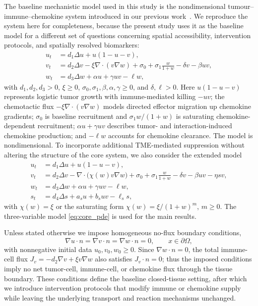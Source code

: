 \documentclass[]{interact}
\theoremstyle{plain}%
\theoremstyle{definition}
\theoremstyle{remark}
\newcommand{\Om}{\Omega}
\begin{document}
The baseline mechanistic model used in this study is the
nondimensional tumour--immune--chemokine system introduced in our
previous work~\cite{liu2026computational}. We reproduce the system
here for completeness, because the present study uses it as the
baseline model for a different set of questions concerning spatial
accessibility, intervention protocols, and spatially resolved
biomarkers:
\begin{equation}
\label{eq:core_pde}
\begin{aligned}
u_t &= d_1\Delta u+u(1-u-v),\\
v_t &= d_2\Delta v-\xi\nabla\cdot(v\nabla w)
+\sigma_0+\sigma_1\frac{w}{1+w}-\delta v-\beta uv,\\
w_t &= d_3\Delta w+\alpha u+\gamma uv-\ell w,
\end{aligned}
\end{equation}
with $d_1,d_2,d_3>0$, $\xi\ge0$, $\sigma_0,\sigma_1,\beta,\alpha,\gamma\ge0$,
and $\delta,\ell>0$. Here $u(1-u-v)$ represents logistic tumor growth
with immune-mediated killing $-uv$; the chemotactic flux
$-\xi\nabla\cdot(v\nabla w)$ models directed effector migration up chemokine
gradients; $\sigma_0$ is baseline recruitment and
$\sigma_1 w/(1+w)$ is saturating chemokine-dependent recruitment;
$\alpha u+\gamma uv$ describes tumor- and interaction-induced chemokine
production; and $-\ell w$ accounts for chemokine clearance. The model is
nondimensional. To incorporate additional TME-mediated suppression without
altering the structure of the core system, we also consider the extended model
\begin{equation}
\label{eq:extended_pde}
\begin{aligned}
u_t &= d_1\Delta u+u(1-u-v),\\
v_t &= d_2\Delta v-\nabla\cdot\!\big(\chi(w)v\nabla w\big)
+\sigma_0+\sigma_1\tfrac{w}{1+w}-\delta v-\beta uv-\eta sv,\\
w_t &= d_3\Delta w+\alpha u+\gamma uv-\ell w,\\
s_t &= d_4\Delta s+a_su+b_suv-\ell_s s,
\end{aligned}
\end{equation}
with $\chi(w)=\xi$ or the saturating form
$\chi(w)=\xi/(1+w)^m$, $m\ge0$. The three-variable model
\eqref{eq:core_pde} is used for the main results.

Unless stated otherwise we impose homogeneous no-flux boundary conditions,
\begin{equation}
\label{eq:noflux_core}
\nabla u\cdot n=\nabla v\cdot n=\nabla w\cdot n=0,\qquad x\in\partial\Om,
\end{equation}
with nonnegative initial data $u_0,v_0,w_0\ge0$. Since $\nabla w\cdot n=0$, the
total immune-cell flux $J_v=-d_2\nabla v+\xi v\nabla w$ also satisfies
$J_v\cdot n=0$; thus the imposed conditions imply no net tumor-cell,
immune-cell, or chemokine flux through the tissue boundary. These conditions
define the baseline closed-tissue setting, after which we introduce
intervention protocols that modify immune or chemokine supply while leaving the
underlying transport and reaction mechanisms unchanged.
\end{document}
